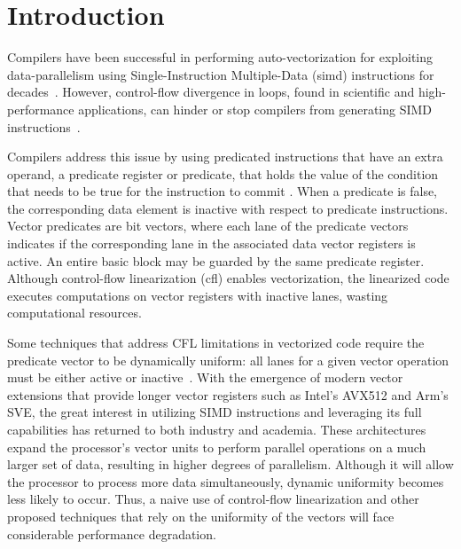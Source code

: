 \chapter{Introduction}

Compilers have been successful in performing auto-vectorization for exploiting data-parallelism using Single-Instruction Multiple-Data (\acrshort{simd}) instructions for decades~\cite{scarborough1986vectorizing,levine1991comparative,sreraman2000vectorizing,maleki2011evaluation}.
However, control-flow divergence in loops, found in scientific and high-performance applications, can hinder or stop compilers from generating SIMD instructions~\cite{allen_conversion_1983,park1991ifconversion}.


Compilers address this issue by using predicated instructions that have an extra operand, a predicate register or predicate, that holds the value of the condition that needs to be true for the instruction to commit \cite{allen_conversion_1983,park1991ifconversion,jaewook_shin_superword-level_2005,shin_introducing_2007,shin_evaluating_2009}.
When a predicate is false, the corresponding data element is inactive with respect to predicate instructions.
Vector predicates are bit vectors, where each lane of the predicate vectors indicates if the corresponding lane in the associated data vector registers is active.
An entire basic block may be guarded by the same predicate register.
Although control-flow linearization (\acrshort{cfl}) enables vectorization, the linearized code executes computations on vector registers with inactive lanes, wasting computational resources.


Some techniques that address CFL limitations in vectorized code require the predicate vector to be dynamically uniform: all lanes for a given vector operation must be either active or inactive~\cite{moll_partial_2018,liu_combining_2022}.
With the emergence of modern vector extensions that provide longer vector registers such as  Intel's AVX512 and Arm's SVE, the great interest in utilizing SIMD instructions and leveraging its full capabilities has returned to both industry and academia. These architectures expand the processor's vector units to perform parallel operations on a much larger set of data, resulting in higher degrees of parallelism. Although it will allow the processor to process more data simultaneously, dynamic uniformity becomes less likely to occur. Thus, a naive use of control-flow linearization and other proposed techniques that rely on the uniformity of the vectors will face considerable performance degradation.


